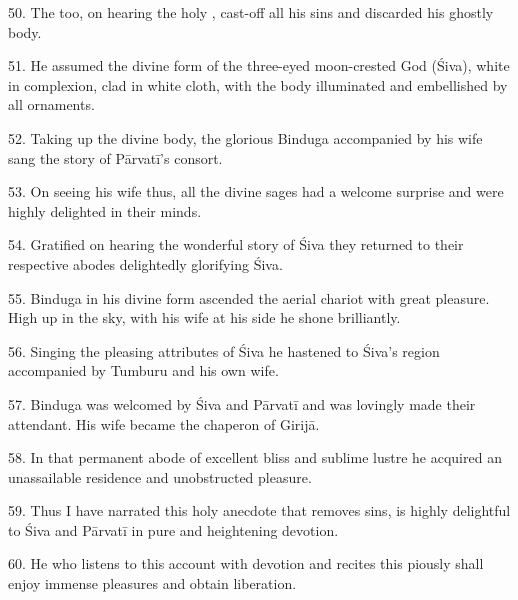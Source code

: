 50. The  too, on hearing the holy , cast-off all his
sins and discarded his ghostly body.

51. He assumed the divine form of the three-eyed moon-crested God (Śiva), white
in complexion, clad in white cloth, with the body illuminated and embellished by
all ornaments.

52. Taking up the divine body, the glorious Binduga accompanied by his wife sang
the story of Pārvatī’s consort.

53. On seeing his wife thus, all the divine sages had a welcome surprise and
were highly delighted in their minds.

54. Gratified on hearing the wonderful story of Śiva they returned to their
respective abodes delightedly glorifying Śiva.

55. Binduga in his divine form ascended the aerial chariot with great pleasure.
High up in the sky, with his wife at his side he shone brilliantly.

56. Singing the pleasing attributes of Śiva he hastened to Śiva’s region
accompanied by Tumburu and his own wife.

57. Binduga was welcomed by Śiva and Pārvatī and was lovingly made their
attendant. His wife became the chaperon of Girijā.

58. In that permanent abode of excellent bliss and sublime lustre he acquired an
unassailable residence and unobstructed pleasure.

59. Thus I have narrated this holy anecdote that removes sins, is highly
delightful to Śiva and Pārvatī in pure and heightening devotion.

60. He who listens to this account with devotion and recites this piously shall
enjoy immense pleasures and obtain liberation.
